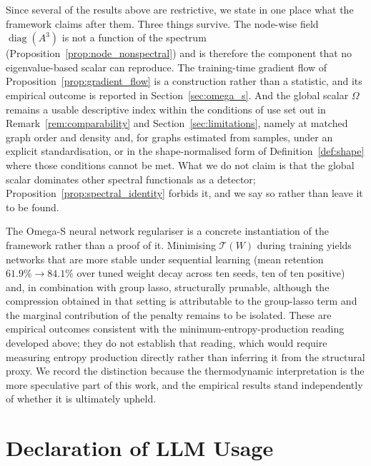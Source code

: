 \documentclass[11pt,a4paper]{article}
\begin{document}
Since several of the results above are restrictive, we state in one place
what the framework claims after them. Three things survive. The node-wise
field $\operatorname{diag}(A^3)$ is not a function of the spectrum
(Proposition~\ref{prop:node_nonspectral}) and is therefore the component
that no eigenvalue-based scalar can reproduce. The training-time gradient
flow of Proposition~\ref{prop:gradient_flow} is a construction rather than a
statistic, and its empirical outcome is reported in
Section~\ref{sec:omega_s}. And the global scalar $\Omega$ remains a usable
descriptive index within the conditions of use set out in
Remark~\ref{rem:comparability} and Section~\ref{sec:limitations}, namely at
matched graph order and density and, for graphs estimated from samples,
under an explicit standardisation, or in the shape-normalised form of
Definition~\ref{def:shape} where those conditions cannot be met. What we do
not claim is that the global
scalar dominates other spectral functionals as a detector; Proposition~\ref{prop:spectral_identity}
forbids it, and we say so rather than leave it to be found.

The Omega-S neural network regulariser is a concrete instantiation of the
framework rather than a proof of it. Minimising $\mathcal{T}(W)$ during
training yields networks that are more stable under sequential learning
(mean retention $61.9\%\to84.1\%$ over tuned weight decay across ten seeds, ten
of ten positive) and, in combination with group lasso, structurally prunable,
although the compression obtained in that setting is attributable to the
group-lasso term and the marginal contribution of the penalty remains to be
isolated. These are empirical outcomes consistent with the
minimum-entropy-production reading developed above; they do not establish
that reading, which would require measuring entropy production directly
rather than inferring it from the structural proxy. We record the
distinction because the thermodynamic interpretation is the more
speculative part of this work, and the empirical results stand
independently of whether it is ultimately upheld.


\section*{Declaration of LLM Usage}
\end{document}
